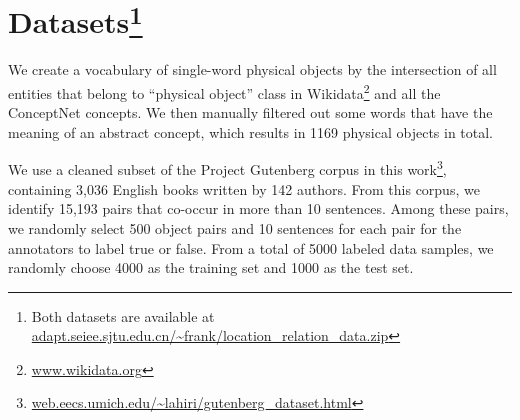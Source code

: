 \section{Datasets\footnote{Both datasets are available at \url{adapt.seiee.sjtu.edu.cn/~frank/location_relation_data.zip}}}
\label{sec:data}
We create a vocabulary of single-word physical objects by the 
intersection of all entities that belong to ``physical object'' class
in Wikidata\footnote{\url{www.wikidata.org}} and 
all the ConceptNet concepts. We then manually filtered out some 
words that have the meaning of an abstract concept, which 
results in 1169 physical objects in total.

We use a cleaned subset of the Project Gutenberg corpus \cite{lahiri:2014:SRW} 
in this work\footnote{\url{web.eecs.umich.edu/~lahiri/gutenberg_dataset.html}}, containing 3,036 English books written by 142 authors.
From this corpus, we identify 15,193 pairs that co-occur in more than 10 sentences.
Among these pairs, we randomly select 500 object pairs and 
10 sentences for each pair for the annotators to label true or false. 
From a total of 5000 labeled data samples, 
we randomly choose 4000 as the training set and 1000 as the test set.

